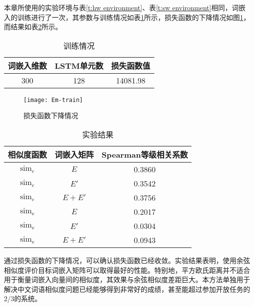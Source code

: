 本章所使用的实验环境与表\ref{t:hw environment}、表\ref{t:sw environment}相同，词嵌入的训练进行了一次，其参数与训练情况如表\ref{t:embedding train}所示，损失函数的下降情况如图\ref{f:embedding loss}，而结果如表\ref{t:embedding result}所示。

\begin{table}[h]
	\caption{训练情况}
	\label{t:embedding train}
	\vspace{0.5em}\centering\wuhao
	\begin{tabular}{ccc}
		\toprule[1.5pt]
		词嵌入维数 & LSTM单元数 & 损失函数值 \\
		\midrule[1pt]
		300 & 128 & 14081.98 \\
		\bottomrule[1.5pt]
	\end{tabular}
\end{table}

\begin{figure}[h]
	\centering
	\texttt{[image: Em-train]}
	\caption{损失函数下降情况}
	\label{f:embedding loss}
	\vspace{-1em}
\end{figure}

\begin{table}[h]
\caption{实验结果}
\label{t:embedding result}
\vspace{0.5em}\centering\wuhao
\begin{tabular}{ccc}
	\toprule[1.5pt]
	相似度函数 & 词嵌入矩阵 & Spearman等级相关系数 \\
	\midrule[1pt]
	$\text{sim}_\text{c}$ & $E$ & 0.3860 \\
	$\text{sim}_\text{c}$ & $E'$ &  0.3542 \\
	$\text{sim}_\text{c}$ & $E + E'$ & 0.3756 \\
	$\text{sim}_\text{e}$ & $E$ &  0.2017 \\
	$\text{sim}_\text{e}$ & $E'$ & 0.0304 \\
	$\text{sim}_\text{e}$ & $E + E'$ & 0.0943 \\
	\bottomrule[1.5pt]
\end{tabular}
\end{table}

通过损失函数的下降情况，可以确认损失函数已经收敛。实验结果表明，使用余弦相似度评价目标词嵌入矩阵可以取得最好的性能。特别地，平方欧氏距离并不适合用于衡量词嵌入向量间的相似度，其效果与余弦相似度差距巨大。本方法单独用于解决中文词语相似度问题已经能够得到非常好的成绩，甚至能超过参加开放任务的2/3的系统。